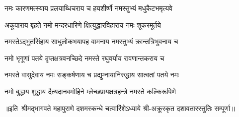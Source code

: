 

\twolineshloka
{नमः कारणमत्स्याय प्रलयाब्धिचराय च}
{हयशीर्ष्णे नमस्तुभ्यं मधुकैटभमृत्यवे}%

\twolineshloka
{अकूपाराय बृहते नमो मन्दरधारिणे}
{क्षित्युद्धारविहाराय नमः शूकरमूर्तये}%

\twolineshloka
{नमस्तेऽद्भुतसिंहाय साधुलोकभयापह}
{वामनाय नमस्तुभ्यं क्रान्तत्रिभुवनाय च}%

\twolineshloka
{नमो भृगूणां पतये दृप्तक्षत्रवनच्छिदे}
{नमस्ते रघुवर्याय रावणान्तकराय च}%

\twolineshloka
{नमस्ते वासुदेवाय नमः सङ्कर्षणाय च}
{प्रद्युम्नायानिरुद्धाय सात्वतां पतये नमः}%

\twolineshloka
{नमो बुद्धाय शुद्धाय दैत्यदानवमोहिने}
{म्लेच्छप्रायक्षत्रहन्त्रे नमस्ते कल्किरूपिणे}%

॥इति~श्रीमद्भागवते महापुराणे दशमस्कन्धे चत्वारिंशेऽध्याये श्री-अक्रूरकृत दशावतारस्तुतिः सम्पूर्णा॥
%

%

%
%
